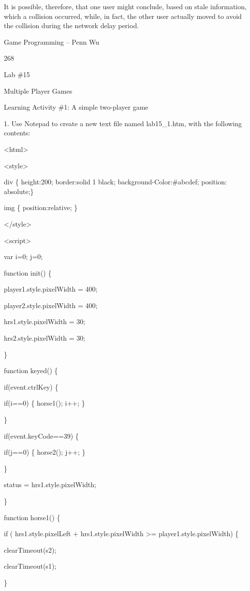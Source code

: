 \documentclass[
]{article}
\begin{document}
It is possible, therefore, that one user might conclude, based on stale
information, which a collision occurred, while, in fact, the other user
actually moved to avoid the collision during the network delay period.

Game Programming -- Penn Wu

268

\protect\hypertarget{index_split_014.htmlux5cux23p269}{}{}

Lab \#15

Multiple Player Games

Learning Activity \#1: A simple two-player game

1. Use Notepad to create a new text file named lab15\_1.htm, with the
following contents:

\textless html\textgreater{}

\textless style\textgreater{}

div \{ height:200; border:solid 1 black; background-Color:\#abcdef;
position: absolute;\}

img \{ position:relative; \}

\textless/style\textgreater{}

\textless script\textgreater{}

var i=0; j=0;

function init() \{

player1.style.pixelWidth = 400;

player2.style.pixelWidth = 400;

hrs1.style.pixelWidth = 30;

hrs2.style.pixelWidth = 30;

\}

function keyed() \{

if(event.ctrlKey) \{

if(i==0) \{ horse1(); i++; \}

\}

if(event.keyCode==39) \{

if(j==0) \{ horse2(); j++; \}

\}

status = hrs1.style.pixelWidth;

\}

function horse1() \{

if ( hrs1.style.pixelLeft + hrs1.style.pixelWidth \textgreater=
player1.style.pixelWidth) \{

clearTimeout(s2);

clearTimeout(s1);

\}
\end{document}
